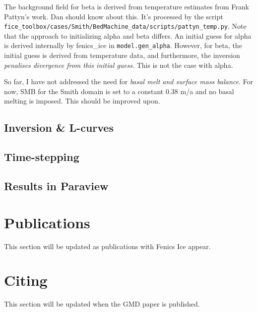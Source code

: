 \documentclass[11pt, reqno, nocenter]{article}
\begin{document}
The background field for beta is derived from temperature estimates from Frank Pattyn's work. Dan should know about this. It's processed by the script\\
 {\tt fice\_toolbox/cases/Smith/BedMachine\_data/scripts/pattyn\_temp.py}. Note that the approach to initializing alpha and beta differs. An initial guess for alpha is derived internally by fenics\_ice in {\tt model.gen\_alpha}. However, for beta, the initial guess is derived from temperature data, and furthermore, the inversion \emph{penalises divergence from this initial guess}. This is not the case with alpha.

So far, I have not addressed the need for \emph{basal melt and surface mass balance}. For now, SMB for the Smith domain is set to a constant 0.38 m/a and no basal melting is imposed. This should be improved upon.

\subsection{Inversion \& L-curves}

\subsection{Time-stepping}

\subsection{Results in Paraview}

\section{Publications}
This section will be updated as publications with Fenics Ice appear.

\section{Citing}
This section will be updated when the GMD paper is published.



\newpage


\end{document}
